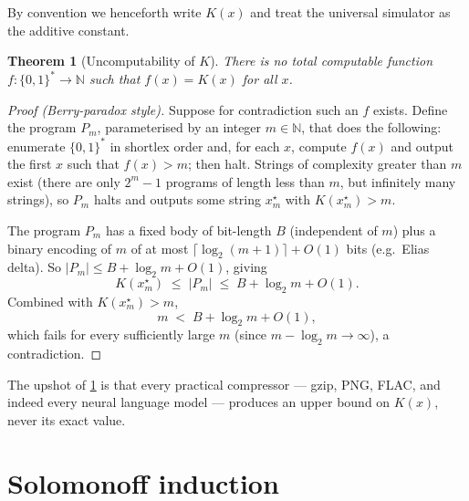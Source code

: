 \documentclass[12pt,a4paper]{article}
\theoremstyle{plain}
\newtheorem{theorem}{Theorem}[section]
\theoremstyle{definition}
\begin{document}
By convention we henceforth write $K(x)$ and treat the universal
simulator as the additive constant.

\begin{theorem}[Uncomputability of $K$]
\label{thm:uncomputable}
There is no total computable function $f : \{0,1\}^* \to \mathbb{N}$
such that $f(x) = K(x)$ for all $x$.
\end{theorem}

\begin{proof}[Proof (Berry-paradox style)]
Suppose for contradiction such an $f$ exists.  Define the program
$P_m$, parameterised by an integer $m \in \mathbb{N}$, that does the
following: enumerate $\{0,1\}^*$ in shortlex order and, for each $x$,
compute $f(x)$ and output the first $x$ such that $f(x) > m$; then
halt.  Strings of complexity greater than $m$ exist (there are only
$2^m - 1$ programs of length less than $m$, but infinitely many
strings), so $P_m$ halts and outputs some string $x_m^\star$ with
$K(x_m^\star) > m$.

The program $P_m$ has a fixed body of bit-length $B$ (independent of
$m$) plus a binary encoding of $m$ of at most
$\lceil \log_2(m+1)\rceil + O(1)$ bits (e.g.\ Elias delta).  So
$|P_m| \le B + \log_2 m + O(1)$, giving
\begin{equation}
  K(x_m^\star) \;\le\; |P_m| \;\le\; B + \log_2 m + O(1).
  \label{eq:berry-upper}
\end{equation}
Combined with $K(x_m^\star) > m$,
\begin{equation}
  m \;<\; B + \log_2 m + O(1),
  \label{eq:berry-contra}
\end{equation}
which fails for every sufficiently large $m$ (since $m - \log_2 m \to
\infty$), a contradiction.
\end{proof}

The upshot of \cref{thm:uncomputable} is that every practical
compressor --- gzip, PNG, FLAC, and indeed every neural language
model --- produces an upper bound on $K(x)$, never its exact value.

\section{Solomonoff induction}
\label{sec:solomonoff}
\end{document}
